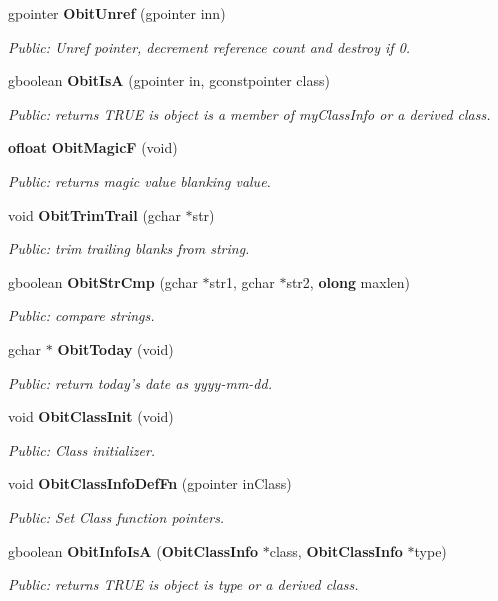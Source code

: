 \begin{CompactItemize}
gpointer {\bf Obit\-Unref} (gpointer inn)
\begin{CompactList}\small\item\em Public: Unref pointer, decrement reference count and destroy if 0. \item\end{CompactList}\item 
gboolean {\bf Obit\-Is\-A} (gpointer in, gconstpointer class)
\begin{CompactList}\small\item\em Public: returns TRUE is object is a member of my\-Class\-Info or a derived class. \item\end{CompactList}\item 
{\bf ofloat} {\bf Obit\-Magic\-F} (void)
\begin{CompactList}\small\item\em Public: returns magic value blanking value. \item\end{CompactList}\item 
void {\bf Obit\-Trim\-Trail} (gchar $\ast$str)
\begin{CompactList}\small\item\em Public: trim trailing blanks from string. \item\end{CompactList}\item 
gboolean {\bf Obit\-Str\-Cmp} (gchar $\ast$str1, gchar $\ast$str2, {\bf olong} maxlen)
\begin{CompactList}\small\item\em Public: compare strings. \item\end{CompactList}\item 
gchar $\ast$ {\bf Obit\-Today} (void)
\begin{CompactList}\small\item\em Public: return today's date as yyyy-mm-dd. \item\end{CompactList}\item 
void {\bf Obit\-Class\-Init} (void)
\begin{CompactList}\small\item\em Public: Class initializer. \item\end{CompactList}\item 
void {\bf Obit\-Class\-Info\-Def\-Fn} (gpointer in\-Class)
\begin{CompactList}\small\item\em Public: Set Class function pointers. \item\end{CompactList}\item 
gboolean {\bf Obit\-Info\-Is\-A} ({\bf Obit\-Class\-Info} $\ast$class, {\bf Obit\-Class\-Info} $\ast$type)
\begin{CompactList}\small\item\em Public: returns TRUE is object is type or a derived class. \item\end{CompactList}\end{CompactItemize}
